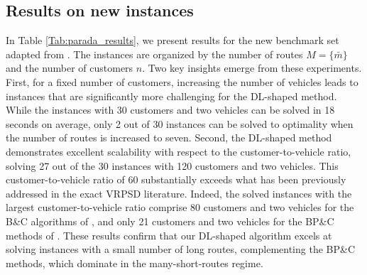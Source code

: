 \documentclass{article}
\newcommand{\rev}[1]{{\color{black}#1}}
\begin{document}
\subsection{Results on new instances} \label{sec:experiments:characteristics}
In Table \ref{Tab:parada_results}, we present results for the new benchmark set adapted from \cite{parada2024disaggregated}. The instances are organized by the number of routes $M=\{\bar{m}\}$ and the number of customers $n$. Two key insights emerge from these experiments. First, for a fixed number of customers, increasing the number of vehicles leads to instances that are significantly more challenging for the DL-shaped method. While the instances with 30 customers and two vehicles can be solved in 18 seconds on average, only 2 out of 30 instances can be solved to optimality when the number of routes is increased to seven. Second, the DL-shaped method demonstrates excellent scalability with respect to the customer-to-vehicle ratio, solving 27 out of the 30 instances with 120 customers and two vehicles. \rev{This customer-to-vehicle ratio of 60 substantially exceeds what has been previously addressed in the exact VRPSD literature.} Indeed, the solved instances with the largest customer-to-vehicle ratio comprise 80 customers and two vehicles \rev{for the B\&C algorithms of \cite{hoogendoorn2023improved, hoogendoorn2025evaluation}}, and only 21 customers and two vehicles \rev{for the BP\&C methods of \cite{florio2020new, florio2023recent}}. These results confirm that our DL-shaped algorithm excels at solving instances with a small number of long routes\rev{, complementing the BP\&C methods, which dominate in the many-short-routes regime}. 
\end{document}
